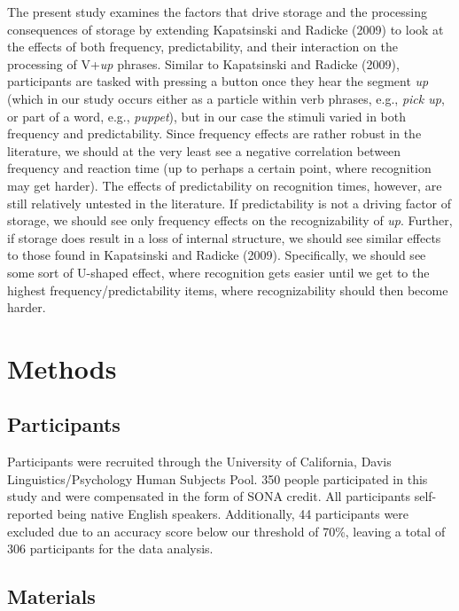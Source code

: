 \documentclass[
  man,floatsintext]{apa6}
\begin{document}
The present study examines the factors that drive storage and the processing consequences of storage by extending Kapatsinski and Radicke (2009) to look at the effects of both frequency, predictability, and their interaction on the processing of V+\emph{up} phrases. Similar to Kapatsinski and Radicke (2009), participants are tasked with pressing a button once they hear the segment \emph{up} (which in our study occurs either as a particle within verb phrases, e.g., \emph{pick up}, or part of a word, e.g., \emph{puppet}), but in our case the stimuli varied in both frequency and predictability. Since frequency effects are rather robust in the literature, we should at the very least see a negative correlation between frequency and reaction time (up to perhaps a certain point, where recognition may get harder). The effects of predictability on recognition times, however, are still relatively untested in the literature. If predictability is not a driving factor of storage, we should see only frequency effects on the recognizability of \emph{up}. Further, if storage does result in a loss of internal structure, we should see similar effects to those found in Kapatsinski and Radicke (2009). Specifically, we should see some sort of U-shaped effect, where recognition gets easier until we get to the highest frequency/predictability items, where recognizability should then become harder.

\section{Methods}\label{methods}

\subsection{Participants}\label{participants}

Participants were recruited through the University of California, Davis Linguistics/Psychology Human Subjects Pool. 350 people participated in this study and were compensated in the form of SONA credit. All participants self-reported being native English speakers. Additionally, 44 participants were excluded due to an accuracy score below our threshold of 70\%, leaving a total of 306 participants for the data analysis.

\subsection{Materials}\label{materials}
\end{document}
